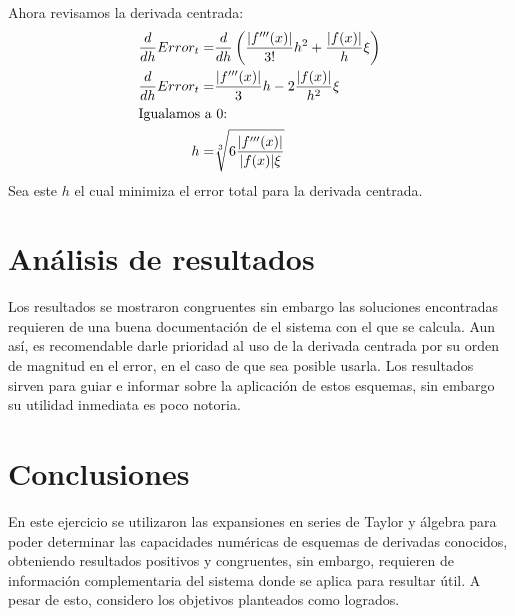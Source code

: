 \documentclass[../portafolio.tex]{subfiles}
\begin{document}
Ahora revisamos la derivada centrada: 
\begin{align}
\frac{d}{dh} Error_{t}=&\frac{d}{dh} \left( \frac{|f'''(x)|}{3!}h^2 + \frac{|f(x)|}{h} \xi \right) \\
\frac{d}{dh}Error_t =& \frac{|f'''(x)|}{3} h - 2 \frac{|f(x)|}{h^2} \xi\\ \intertext{Igualamos a 0:}
h=&\sqrt[3]{6\frac{|f'''(x)|}{|f(x)|\xi}}
\end{align}
Sea este $h$ el cual minimiza el error total para la derivada centrada.


\section{Análisis de resultados}
Los resultados se mostraron congruentes sin embargo las soluciones encontradas requieren de una buena documentación de el sistema con el que se calcula. Aun así, es recomendable darle prioridad al uso de la derivada centrada por su orden de magnitud en el error, en el caso de que sea posible usarla. Los resultados sirven para guiar e informar sobre la aplicación de estos esquemas, sin embargo su utilidad inmediata es poco notoria.
\section*{Conclusiones}
En este ejercicio se utilizaron las expansiones en series de Taylor y álgebra para poder determinar las capacidades numéricas de esquemas de derivadas conocidos, obteniendo resultados positivos y congruentes, sin embargo, requieren de información complementaria del sistema donde se aplica para resultar útil. A pesar de esto, considero los objetivos planteados como logrados.
\end{document}
